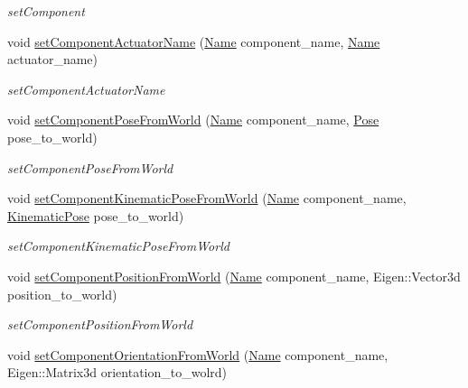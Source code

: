 \begin{DoxyCompactItemize}
\begin{DoxyCompactList}\small\item\em set\+Component \end{DoxyCompactList}\item 
void \hyperlink{classrobotis__manipulator_1_1_manipulator_a27e5f2bca0da521334d59600134bd28b}{set\+Component\+Actuator\+Name} (\hyperlink{namespacerobotis__manipulator_a08c2d25e77a01ad75b9bb740f8ce4765}{Name} component\+\_\+name, \hyperlink{namespacerobotis__manipulator_a08c2d25e77a01ad75b9bb740f8ce4765}{Name} actuator\+\_\+name)
\begin{DoxyCompactList}\small\item\em set\+Component\+Actuator\+Name \end{DoxyCompactList}\item 
void \hyperlink{classrobotis__manipulator_1_1_manipulator_ad070b3aba379f97459e2c784626d05a4}{set\+Component\+Pose\+From\+World} (\hyperlink{namespacerobotis__manipulator_a08c2d25e77a01ad75b9bb740f8ce4765}{Name} component\+\_\+name, \hyperlink{structrobotis__manipulator_1_1_pose}{Pose} pose\+\_\+to\+\_\+world)
\begin{DoxyCompactList}\small\item\em set\+Component\+Pose\+From\+World \end{DoxyCompactList}\item 
void \hyperlink{classrobotis__manipulator_1_1_manipulator_a385fe607bab5200b5898541d4d03a005}{set\+Component\+Kinematic\+Pose\+From\+World} (\hyperlink{namespacerobotis__manipulator_a08c2d25e77a01ad75b9bb740f8ce4765}{Name} component\+\_\+name, \hyperlink{structrobotis__manipulator_1_1_kinematic_pose}{Kinematic\+Pose} pose\+\_\+to\+\_\+world)
\begin{DoxyCompactList}\small\item\em set\+Component\+Kinematic\+Pose\+From\+World \end{DoxyCompactList}\item 
void \hyperlink{classrobotis__manipulator_1_1_manipulator_ab3b7bbd92252755711019606642f83c6}{set\+Component\+Position\+From\+World} (\hyperlink{namespacerobotis__manipulator_a08c2d25e77a01ad75b9bb740f8ce4765}{Name} component\+\_\+name, Eigen\+::\+Vector3d position\+\_\+to\+\_\+world)
\begin{DoxyCompactList}\small\item\em set\+Component\+Position\+From\+World \end{DoxyCompactList}\item 
void \hyperlink{classrobotis__manipulator_1_1_manipulator_a692e8e4bdf8affcfe615f7fc56f1d5f0}{set\+Component\+Orientation\+From\+World} (\hyperlink{namespacerobotis__manipulator_a08c2d25e77a01ad75b9bb740f8ce4765}{Name} component\+\_\+name, Eigen\+::\+Matrix3d orientation\+\_\+to\+\_\+wolrd)

\end{DoxyCompactItemize}

